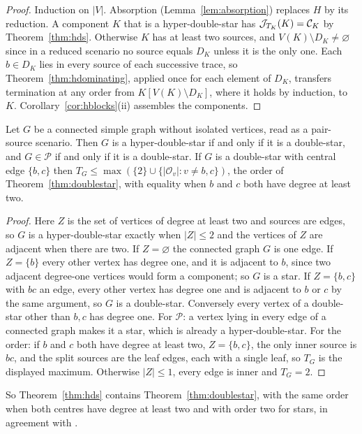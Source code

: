 \begin{proof}
Induction on $|V|$. Absorption (Lemma~\ref{lem:absorption}) replaces $H$ by its reduction. A component $K$ that is a hyper-double-star has $\mathcal J_{T_K}(K)=\mathcal C_{K}$ by Theorem~\ref{thm:hds}. Otherwise $K$ has at least two sources, and $V(K)\setminus D_K\ne\varnothing$ since in a reduced scenario no source equals $D_K$ unless it is the only one. Each $b\in D_K$ lies in every source of each successive trace, so Theorem~\ref{thm:hdominating}, applied once for each element of $D_K$, transfers termination at any order from $K[V(K)\setminus D_K]$, where it holds by induction, to $K$. Corollary~\ref{cor:hblocks}(ii) assembles the components.
\end{proof}

\begin{proposition}[Graphs]\label{prop:hgraph}
Let $G$ be a connected simple graph without isolated vertices, read as a pair-source scenario. Then $G$ is a hyper-double-star if and only if it is a double-star, and $G\in\mathcal P$ if and only if it is a double-star. If $G$ is a double-star with central edge $\{b,c\}$ then $T_G\le\max(\{2\}\cup\{|\mathcal O_v|:v\ne b,c\})$, the order of Theorem~\ref{thm:doublestar}, with equality when $b$ and $c$ both have degree at least two.
\end{proposition}

\begin{proof}
Here $Z$ is the set of vertices of degree at least two and sources are edges, so $G$ is a hyper-double-star exactly when $|Z|\le2$ and the vertices of $Z$ are adjacent when there are two. If $Z=\varnothing$ the connected graph $G$ is one edge. If $Z=\{b\}$ every other vertex has degree one, and it is adjacent to $b$, since two adjacent degree-one vertices would form a component; so $G$ is a star. If $Z=\{b,c\}$ with $bc$ an edge, every other vertex has degree one and is adjacent to $b$ or $c$ by the same argument, so $G$ is a double-star. Conversely every vertex of a double-star other than $b,c$ has degree one. For $\mathcal P$: a vertex lying in every edge of a connected graph makes it a star, which is already a hyper-double-star. For the order: if $b$ and $c$ both have degree at least two, $Z=\{b,c\}$, the only inner source is $bc$, and the split sources are the leaf edges, each with a single leaf, so $T_G$ is the displayed maximum. Otherwise $|Z|\le1$, every edge is inner and $T_G=2$.
\end{proof}

So Theorem~\ref{thm:hds} contains Theorem~\ref{thm:doublestar}, with the same order when both centres have degree at least two and with order two for stars, in agreement with \cite[Section 4.1]{NW2020}.

